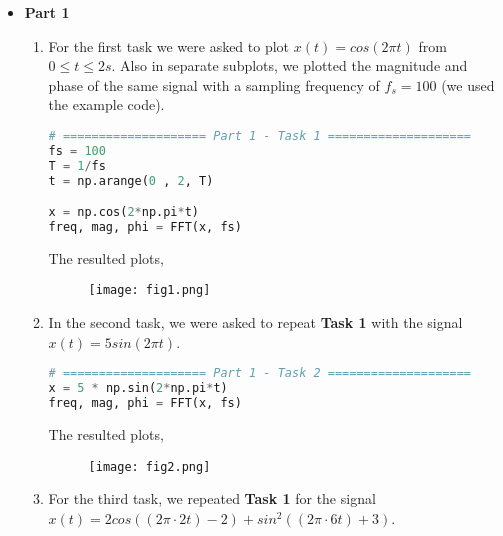 \documentclass[12pt,a4paper]{article}
\begin{document}
\begin{itemize}

\item \textbf{Part 1}\\
\begin{enumerate}

    \item
    For the first task we were asked to plot $x(t) = cos(2\pi t)$ from $0 \leq t \leq 2s$. Also in separate subplots, we plotted the magnitude and phase of the same signal with a sampling frequency of $f_s = 100$ (we used the example code).\\

\begin{lstlisting}[language=Python, caption={Task 1, Part 1}, label={lst:code}, mathescape=true, breaklines=true]
# ==================== Part 1 - Task 1 ====================
fs = 100
T = 1/fs
t = np.arange(0 , 2, T)

x = np.cos(2*np.pi*t)
freq, mag, phi = FFT(x, fs)
\end{lstlisting}

The resulted plots,

\begin{figure}[h]
    \centering
    \texttt{[image: fig1.png]}
\end{figure}\textbf{}
\clearpage

    \item
    In the second task, we were asked to repeat \textbf{Task 1} with the signal $x(t) = 5sin(2\pi t)$.\\
    
\begin{lstlisting}[language=Python, caption={Task 2, Part 1}, label={lst:code}, mathescape=true, breaklines=true]
# ==================== Part 1 - Task 2 ====================
x = 5 * np.sin(2*np.pi*t)
freq, mag, phi = FFT(x, fs)
\end{lstlisting}

The resulted plots,

\begin{figure}[h]
    \centering
    \texttt{[image: fig2.png]}
\end{figure}\textbf{}
\clearpage

    \item
    For the third task, we repeated \textbf{Task 1} for the signal $x(t) = 2cos((2\pi \cdot 2t) - 2) + sin^2((2\pi \cdot 6t) + 3)$.\\
    

\end{enumerate}
\end{itemize}
\end{document}

